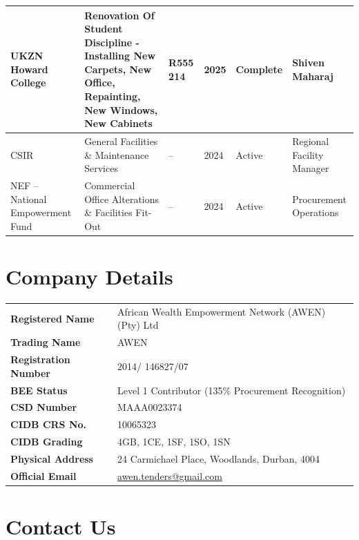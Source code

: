 \documentclass[a4paper,11pt]{article}
\begin{document}
{\begin{longtable}{@{} p{2.8cm} p{4.6cm} p{1.6cm} C{1.0cm} p{1.6cm} p{3.4cm} @{}}
  \midrule
  UKZN Howard College & Renovation Of Student Discipline -Installing New Carpets, New Office, Repainting, New Windows, New Cabinets & R555 214 & 2025 & Complete & Shiven Maharaj \\
  \midrule
  CSIR & General Facilities \& Maintenance Services & -- & 2024 & Active & Regional Facility Manager \\
  \midrule
  NEF – National Empowerment Fund & Commercial Office Alterations \& Facilities Fit-Out & -- & 2024 & Active & Procurement Operations \\
  \bottomrule
\end{longtable}
}

\newpage

\section{Company Details}

{\color{awenDarkGrey}
\renewcommand{\arraystretch}{1.65}
\begin{tabularx}{\textwidth}{@{} >{\bfseries\color{awenMaroon}}L{4.8cm} X @{}}
  \toprule
  Registered Name     & African Wealth Empowerment Network (AWEN) (Pty) Ltd \\
  Trading Name        & AWEN \\
  Registration Number & 2014/ 146827/07 \\
  BEE Status          & Level 1 Contributor (135\% Procurement Recognition) \\
  CSD Number          & MAAA0023374 \\
  CIDB CRS No.        & 10065323 \\
  CIDB Grading        & 4GB, 1CE, 1SF, 1SO, 1SN \\
  Physical Address    & 24 Carmichael Place, Woodlands, Durban, 4004 \\
  Official Email      & \href{mailto:awen.tenders@gmail.com}{awen.tenders@gmail.com} \\
  \bottomrule
\end{tabularx}
}

\vspace{1.0cm}

\section{Contact Us}
\end{document}
